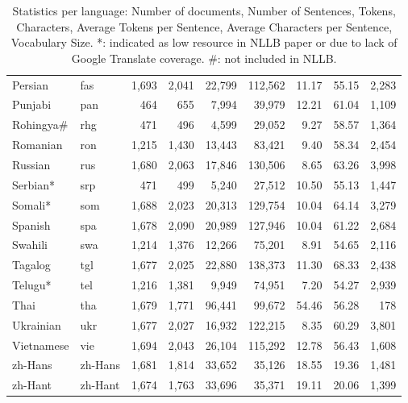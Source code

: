 \begin{table}[t]
\begin{tabular}{l l r r r r r r r}
Persian & fas & 1,693 & 2,041 & 22,799 & 112,562 & 11.17 & 55.15 & 2,283 \\
Punjabi & pan & 464 & 655 & 7,994 & 39,979 & 12.21 & 61.04 & 1,109 \\
Rohingya\# & rhg & 471 & 496 & 4,599 & 29,052 & 9.27 & 58.57 & 1,364 \\
Romanian & ron & 1,215 & 1,430 & 13,443 & 83,421 & 9.40 & 58.34 & 2,454 \\
Russian & rus & 1,680 & 2,063 & 17,846 & 130,506 & 8.65 & 63.26 & 3,998 \\
Serbian* & srp & 471 & 499 & 5,240 & 27,512 & 10.50 & 55.13 & 1,447 \\
Somali* & som & 1,688 & 2,023 & 20,313 & 129,754 & 10.04 & 64.14 & 3,279 \\
Spanish & spa & 1,678 & 2,090 & 20,989 & 127,946 & 10.04 & 61.22 & 2,684 \\
Swahili & swa & 1,214 & 1,376 & 12,266 & 75,201 & 8.91 & 54.65 & 2,116 \\
Tagalog & tgl & 1,677 & 2,025 & 22,880 & 138,373 & 11.30 & 68.33 & 2,438 \\
Telugu* & tel & 1,216 & 1,381 & 9,949 & 74,951 & 7.20 & 54.27 & 2,939 \\
Thai & tha & 1,679 & 1,771 & 96,441 & 99,672 & 54.46 & 56.28 & 178 \\
Ukrainian & ukr & 1,677 & 2,027 & 16,932 & 122,215 & 8.35 & 60.29 & 3,801 \\
Vietnamese & vie & 1,694 & 2,043 & 26,104 & 115,292 & 12.78 & 56.43 & 1,608 \\
zh-Hans & zh-Hans & 1,681 & 1,814 & 33,652 & 35,126 & 18.55 & 19.36 & 1,481 \\
zh-Hant & zh-Hant & 1,674 & 1,763 & 33,696 & 35,371 & 19.11 & 20.06 & 1,399 \\
\bottomrule
\end{tabular}
\caption{Statistics per language: Number of documents, Number of Sentences, Tokens, Characters, Average Tokens per Sentence, Average Characters per Sentence, Vocabulary Size. *: indicated as low resource in NLLB paper or due to lack of Google Translate coverage. \#: not included in NLLB.}
\label{tab:combined_per_language_stats}
\end{table}
